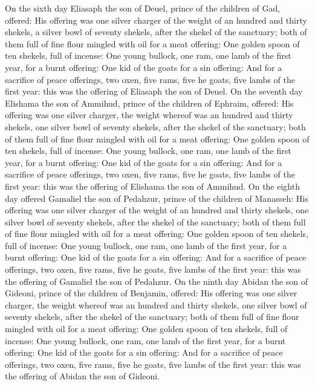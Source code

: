 \begin{biblechapter}
\verse On the sixth day Eliasaph the son of Deuel, prince of the children of Gad, offered:
\verse His offering was one silver charger of the weight of an hundred and thirty shekels, a silver bowl of seventy shekels, after the shekel of the sanctuary; both of them full of fine flour mingled with oil for a meat offering:
\verse One golden spoon of ten shekels, full of incense:
\verse One young bullock, one ram, one lamb of the first year, for a burnt offering:
\verse One kid of the goats for a sin offering:
\verse And for a sacrifice of peace offerings, two oxen, five rams, five he goats, five lambs of the first year: this was the offering of Eliasaph the son of Deuel.
\verse On the seventh day Elishama the son of Ammihud, prince of the children of Ephraim, offered:
\verse His offering was one silver charger, the weight whereof was an hundred and thirty shekels, one silver bowl of seventy shekels, after the shekel of the sanctuary; both of them full of fine flour mingled with oil for a meat offering:
\verse One golden spoon of ten shekels, full of incense:
\verse One young bullock, one ram, one lamb of the first year, for a burnt offering:
\verse One kid of the goats for a sin offering:
\verse And for a sacrifice of peace offerings, two oxen, five rams, five he goats, five lambs of the first year: this was the offering of Elishama the son of Ammihud.
\verse On the eighth day offered Gamaliel the son of Pedahzur, prince of the children of Manasseh:
\verse His offering was one silver charger of the weight of an hundred and thirty shekels, one silver bowl of seventy shekels, after the shekel of the sanctuary; both of them full of fine flour mingled with oil for a meat offering:
\verse One golden spoon of ten shekels, full of incense:
\verse One young bullock, one ram, one lamb of the first year, for a burnt offering:
\verse One kid of the goats for a sin offering:
\verse And for a sacrifice of peace offerings, two oxen, five rams, five he goats, five lambs of the first year: this was the offering of Gamaliel the son of Pedahzur.
\verse On the ninth day Abidan the son of Gideoni, prince of the children of Benjamin, offered:
\verse His offering was one silver charger, the weight whereof was an hundred and thirty shekels, one silver bowl of seventy shekels, after the shekel of the sanctuary; both of them full of fine flour mingled with oil for a meat offering:
\verse One golden spoon of ten shekels, full of incense:
\verse One young bullock, one ram, one lamb of the first year, for a burnt offering:
\verse One kid of the goats for a sin offering:
\verse And for a sacrifice of peace offerings, two oxen, five rams, five he goats, five lambs of the first year: this was the offering of Abidan the son of Gideoni.

\end{biblechapter}

